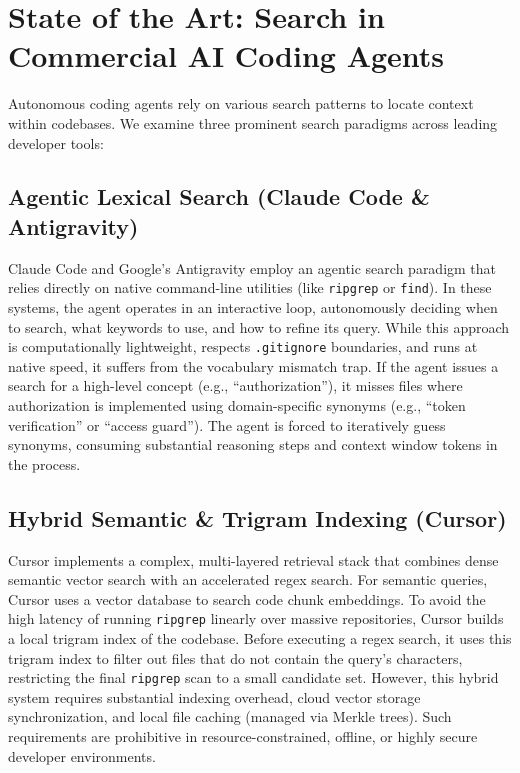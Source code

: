\documentclass[11pt,a4paper]{article}
\begin{document}
\section{State of the Art: Search in Commercial AI Coding Agents}
Autonomous coding agents rely on various search patterns to locate context within codebases. We examine three prominent search paradigms across leading developer tools:

\subsection{Agentic Lexical Search (Claude Code \& Antigravity)}
Claude Code \cite{claudecode} and Google's Antigravity employ an agentic search paradigm that relies directly on native command-line utilities (like \texttt{ripgrep} or \texttt{find}). In these systems, the agent operates in an interactive loop, autonomously deciding when to search, what keywords to use, and how to refine its query. 
While this approach is computationally lightweight, respects \texttt{.gitignore} boundaries, and runs at native speed, it suffers from the vocabulary mismatch trap. If the agent issues a search for a high-level concept (e.g., ``authorization''), it misses files where authorization is implemented using domain-specific synonyms (e.g., ``token verification'' or ``access guard''). The agent is forced to iteratively guess synonyms, consuming substantial reasoning steps and context window tokens in the process.

\subsection{Hybrid Semantic \& Trigram Indexing (Cursor)}
Cursor \cite{cursor} implements a complex, multi-layered retrieval stack that combines dense semantic vector search with an accelerated regex search. For semantic queries, Cursor uses a vector database to search code chunk embeddings. To avoid the high latency of running \texttt{ripgrep} linearly over massive repositories, Cursor builds a local trigram index of the codebase. Before executing a regex search, it uses this trigram index to filter out files that do not contain the query's characters, restricting the final \texttt{ripgrep} scan to a small candidate set.
However, this hybrid system requires substantial indexing overhead, cloud vector storage synchronization, and local file caching (managed via Merkle trees). Such requirements are prohibitive in resource-constrained, offline, or highly secure developer environments.
\end{document}
